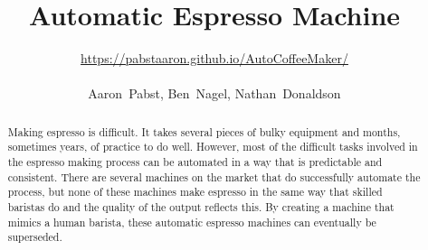 \documentclass[conference]{IEEEtran}
\begin{document}
\title{Automatic Espresso Machine}

\author{\url{https://pabstaaron.github.io/AutoCoffeeMaker/} \\ \\ Aaron~Pabst, Ben~Nagel, Nathan~Donaldson}




% 


\maketitle
\begin{abstract}

Making espresso is difficult. It takes several pieces of bulky equipment and months, sometimes
years, of practice to do well. However, most of the difficult tasks
involved in the espresso making process can be automated in a way that is predictable and
consistent. There are several machines on the market that do successfully
automate the process, but none of these machines make espresso in the same way that
skilled baristas do and the quality of the output reflects this. By creating a
machine that mimics a human barista, these automatic espresso machines can eventually be
superseded.
\end{abstract}
\end{document}
